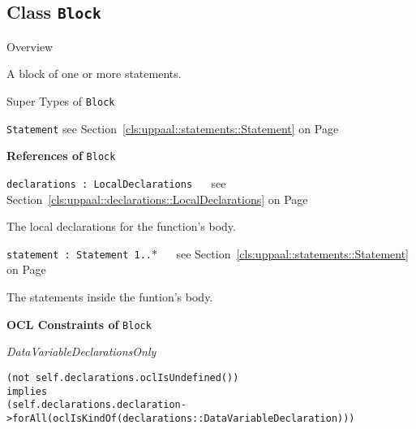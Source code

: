 \subsection{Class \bfseries \texttt{Block}\normalfont}
\label{cls:uppaal::statements::Block} 
	
	\begin{longdescription}
		\item[Overview] 		
				

	

		A block of one or more statements.		
		\item[Super Types of \texttt{Block}] ~
			\begin{longdescription}
				\item[\texttt{Statement}] see Section~\ref{cls:uppaal::statements::Statement} on Page~\pageref{cls:uppaal::statements::Statement}						\end{longdescription}
		
	
			\item[\textbf{References of} \texttt{Block}] ~
			\begin{longdescription}
	\item[\texttt{declarations : LocalDeclarations 	}] ~
	see Section~\ref{cls:uppaal::declarations::LocalDeclarations} on Page~\pageref{cls:uppaal::declarations::LocalDeclarations}
	
	\nopagebreak
		
				

	

		The local declarations for the function's body.		
	\item[\texttt{statement : Statement 	\symbol{"5B}1..$*$\symbol{"5D}
}] ~
	see Section~\ref{cls:uppaal::statements::Statement} on Page~\pageref{cls:uppaal::statements::Statement}
	
	\nopagebreak
		
				

	

		The statements inside the funtion's body.		
			\end{longdescription}
			\item[\textbf{OCL Constraints of} \texttt{Block}] ~
			\begin{longdescription}
	\item[\small\textit{DataVariableDeclarationsOnly}] ~ 
	\nopagebreak
	
		\begin{lstlisting}[breaklines=true]
(not self.declarations.oclIsUndefined())
implies
(self.declarations.declaration->forAll(oclIsKindOf(declarations::DataVariableDeclaration)))		\end{lstlisting}
			\end{longdescription}
	
	\end{longdescription}
	

